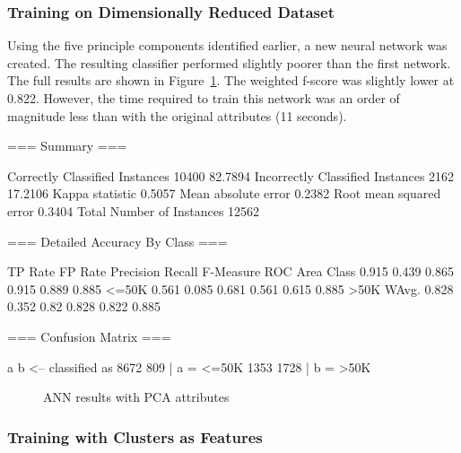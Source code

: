 \documentclass{sig-alternate}
\begin{document}
\subsubsection{Training on Dimensionally Reduced Dataset}

Using the five principle components identified earlier, a new neural network was created. The resulting classifier performed slightly poorer than the first network. The full results are shown in Figure~\ref{ann-summary-pca}. The weighted f-score was slightly lower at 0.822. However, the time required to train this network was an order of magnitude less than with the original attributes (11 seconds).


\tiny
\begin{verbbox}
=== Summary ===

Correctly Classified Instances       10400               82.7894 %
Incorrectly Classified Instances      2162               17.2106 %
Kappa statistic                          0.5057
Mean absolute error                      0.2382
Root mean squared error                  0.3404
Total Number of Instances            12562     

=== Detailed Accuracy By Class ===

       TP Rate   FP Rate   Precision   Recall  F-Measure   ROC Area  Class
         0.915     0.439      0.865     0.915     0.889      0.885     <=50K
         0.561     0.085      0.681     0.561     0.615      0.885     >50K
WAvg.    0.828     0.352      0.82      0.828     0.822      0.885

=== Confusion Matrix ===

    a    b   <-- classified as
 8672  809 |    a =  <=50K
 1353 1728 |    b =  >50K
\end{verbbox}
\normalsize

\begin{figure}[!htbp]
    \centering
    \theverbbox
    \caption{ANN results with PCA attributes\label{ann-summary-pca}}
\end{figure}



\subsubsection{Training with Clusters as Features}
\end{document}
